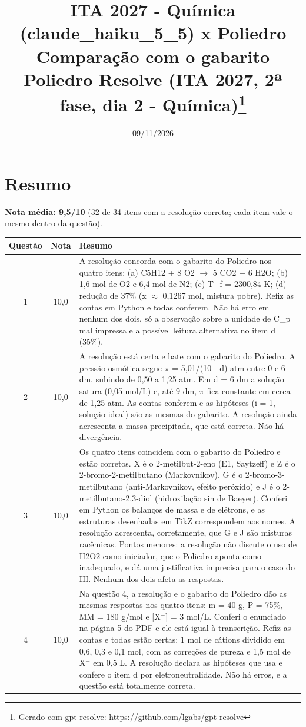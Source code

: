 \documentclass{article}%
\title{ITA 2027 {-} Química (claude\_haiku\_5\_5) x Poliedro\\[4pt]\large Comparação com o gabarito Poliedro Resolve (ITA 2027, 2ª fase, dia 2 {-} Química)\thanks{Gerado com gpt-resolve: \url{https://github.com/lgabs/gpt-resolve}}}%
\date{09/11/2026}%
\begin{document}
%
\normalsize%
\maketitle%
\section*{Resumo}\textbf{Nota média: 9,5/10} (32 de 34 itens com a resolução correta; cada item vale o mesmo dentro da questão).\par\medskip%
\begin{longtable}{@{}c c p{}@{}}\toprule Questão & Nota & Resumo \\ \midrule
1 & 10,0 & A resolução concorda com o gabarito do Poliedro nos quatro itens: (a) C5H12 + 8 O2 $\to$ 5 CO2 + 6 H2O; (b) 1,6 mol de O2 e 6,4 mol de N2; (c) T\_f = 2300,84 K; (d) redução de 37\% (x $\approx$ 0,1267 mol, mistura pobre). Refiz as contas em Python e todas conferem. Não há erro em nenhum dos dois, só a observação sobre a unidade de C\_p mal impressa e a possível leitura alternativa no item d (35\%). \\
2 & 10,0 & A resolução está certa e bate com o gabarito do Poliedro. A pressão osmótica segue $\pi$ = 5,01/(10 - d) atm entre 0 e 6 dm, subindo de 0,50 a 1,25 atm. Em d = 6 dm a solução satura (0,05 mol/L) e, até 9 dm, $\pi$ fica constante em cerca de 1,25 atm. As contas conferem e as hipóteses (i = 1, solução ideal) são as mesmas do gabarito. A resolução ainda acrescenta a massa precipitada, que está correta. Não há divergência. \\
3 & 10,0 & Os quatro itens coincidem com o gabarito do Poliedro e estão corretos. X é o 2{-}metilbut{-}2{-}eno (E1, Saytzeff) e Z é o 2{-}bromo{-}2{-}metilbutano (Markovnikov). G é o 2{-}bromo{-}3{-}metilbutano (anti{-}Markovnikov, efeito peróxido) e J é o 2{-}metilbutano{-}2,3{-}diol (hidroxilação sin de Baeyer). Conferi em Python os balanços de massa e de elétrons, e as estruturas desenhadas em TikZ correspondem aos nomes. A resolução acrescenta, corretamente, que G e J são misturas racêmicas. Pontos menores: a resolução não discute o uso de H2O2 como iniciador, que o Poliedro aponta como inadequado, e dá uma justificativa imprecisa para o caso do HI. Nenhum dos dois afeta as respostas. \\
4 & 10,0 & Na questão 4, a resolução e o gabarito do Poliedro dão as mesmas respostas nos quatro itens: m = 40 g, P = 75\%, MM = 180 g/mol e {[}X$^{-}${]} = 3 mol/L. Conferi o enunciado na página 5 do PDF e ele está igual à transcrição. Refiz as contas e todas estão certas: 1 mol de cátions dividido em 0,6, 0,3 e 0,1 mol, com as correções de pureza e 1,5 mol de X$^{-}$ em 0,5 L. A resolução declara as hipóteses que usa e confere o item d por eletroneutralidade. Não há erros, e a questão está totalmente correta. \\

\end{longtable}
\end{document}
